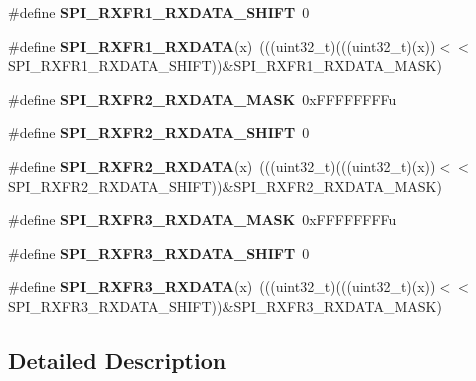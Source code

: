 \begin{DoxyCompactItemize}
\item 
\#define {\bfseries S\+P\+I\+\_\+\+R\+X\+F\+R1\+\_\+\+R\+X\+D\+A\+T\+A\+\_\+\+S\+H\+I\+FT}~0\hypertarget{group__SPI__Register__Masks_gab6747e932cee7cbdab3b46213f8d793b}{}\label{group__SPI__Register__Masks_gab6747e932cee7cbdab3b46213f8d793b}

\item 
\#define {\bfseries S\+P\+I\+\_\+\+R\+X\+F\+R1\+\_\+\+R\+X\+D\+A\+TA}(x)~(((uint32\+\_\+t)(((uint32\+\_\+t)(x))$<$$<$S\+P\+I\+\_\+\+R\+X\+F\+R1\+\_\+\+R\+X\+D\+A\+T\+A\+\_\+\+S\+H\+I\+FT))\&S\+P\+I\+\_\+\+R\+X\+F\+R1\+\_\+\+R\+X\+D\+A\+T\+A\+\_\+\+M\+A\+SK)\hypertarget{group__SPI__Register__Masks_gac6df902214c0e119f65e494ad20d21c6}{}\label{group__SPI__Register__Masks_gac6df902214c0e119f65e494ad20d21c6}

\item 
\#define {\bfseries S\+P\+I\+\_\+\+R\+X\+F\+R2\+\_\+\+R\+X\+D\+A\+T\+A\+\_\+\+M\+A\+SK}~0x\+F\+F\+F\+F\+F\+F\+F\+Fu\hypertarget{group__SPI__Register__Masks_ga659737d6e82c6f3ace0e1d568157426f}{}\label{group__SPI__Register__Masks_ga659737d6e82c6f3ace0e1d568157426f}

\item 
\#define {\bfseries S\+P\+I\+\_\+\+R\+X\+F\+R2\+\_\+\+R\+X\+D\+A\+T\+A\+\_\+\+S\+H\+I\+FT}~0\hypertarget{group__SPI__Register__Masks_gac8d903abae42a6b97dcbdc5bf31b1276}{}\label{group__SPI__Register__Masks_gac8d903abae42a6b97dcbdc5bf31b1276}

\item 
\#define {\bfseries S\+P\+I\+\_\+\+R\+X\+F\+R2\+\_\+\+R\+X\+D\+A\+TA}(x)~(((uint32\+\_\+t)(((uint32\+\_\+t)(x))$<$$<$S\+P\+I\+\_\+\+R\+X\+F\+R2\+\_\+\+R\+X\+D\+A\+T\+A\+\_\+\+S\+H\+I\+FT))\&S\+P\+I\+\_\+\+R\+X\+F\+R2\+\_\+\+R\+X\+D\+A\+T\+A\+\_\+\+M\+A\+SK)\hypertarget{group__SPI__Register__Masks_ga88f81c7a0134abe2eb9dac410625fee3}{}\label{group__SPI__Register__Masks_ga88f81c7a0134abe2eb9dac410625fee3}

\item 
\#define {\bfseries S\+P\+I\+\_\+\+R\+X\+F\+R3\+\_\+\+R\+X\+D\+A\+T\+A\+\_\+\+M\+A\+SK}~0x\+F\+F\+F\+F\+F\+F\+F\+Fu\hypertarget{group__SPI__Register__Masks_ga06579b6d579b820152dd81435d71c09e}{}\label{group__SPI__Register__Masks_ga06579b6d579b820152dd81435d71c09e}

\item 
\#define {\bfseries S\+P\+I\+\_\+\+R\+X\+F\+R3\+\_\+\+R\+X\+D\+A\+T\+A\+\_\+\+S\+H\+I\+FT}~0\hypertarget{group__SPI__Register__Masks_gaae4c2a3c38669f7a03fbcaabd29de0c7}{}\label{group__SPI__Register__Masks_gaae4c2a3c38669f7a03fbcaabd29de0c7}

\item 
\#define {\bfseries S\+P\+I\+\_\+\+R\+X\+F\+R3\+\_\+\+R\+X\+D\+A\+TA}(x)~(((uint32\+\_\+t)(((uint32\+\_\+t)(x))$<$$<$S\+P\+I\+\_\+\+R\+X\+F\+R3\+\_\+\+R\+X\+D\+A\+T\+A\+\_\+\+S\+H\+I\+FT))\&S\+P\+I\+\_\+\+R\+X\+F\+R3\+\_\+\+R\+X\+D\+A\+T\+A\+\_\+\+M\+A\+SK)\hypertarget{group__SPI__Register__Masks_gaa0268e30e0adb838413ec371a2afecf7}{}\label{group__SPI__Register__Masks_gaa0268e30e0adb838413ec371a2afecf7}

\end{DoxyCompactItemize}


\subsection{Detailed Description}
